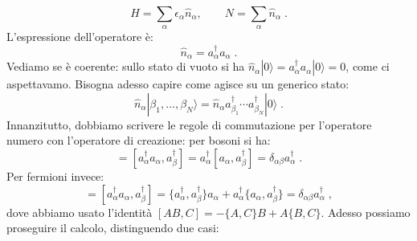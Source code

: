 \documentclass[10pt,a4paper]{report}
\theoremstyle{definition}
\numberwithin{equation}{section}
\newcommand{\ket}{\rangle}
\begin{document}
$$
H=\sum_{\alpha}\epsilon_{\alpha}\hat{n}_{\alpha},\qquad N=\sum_{\alpha}\hat{n}_{\alpha}\;.
$$
L'espressione dell'operatore è:
\begin{equation}
\hat{n}_{\alpha}=a_{\alpha}^{\dagger}a_{\alpha}\;.
\end{equation}
Vediamo se è coerente: sullo stato di vuoto si ha $\hat{n}_{\alpha}|0\ket=a_{\alpha}^{\dagger}a_{\alpha}|0\ket=0$, come ci aspettavamo. Bisogna adesso capire come agisce su un generico stato:
$$
\hat{n}_{\alpha}|\beta_1,\ldots,\beta_N\ket=\hat{n}_{\alpha}a_{\beta_1}^{\dagger}\cdots a_{\beta_N}^{\dagger}|0\ket\;.
$$
Innanzitutto, dobbiamo scrivere le regole di commutazione per l'operatore numero con l'operatore di creazione: per bosoni si ha:
\begin{equation}
[\hat{n}_{\alpha},a_{\beta}^{\dagger}]=[a_{\alpha}^{\dagger}a_{\alpha},a_{\beta}^{\dagger}]=a_{\alpha}^{\dagger}[a_{\alpha},a_{\beta}^{\dagger}]=\delta_{\alpha\beta}a_{\alpha}^{\dagger}\;.
\end{equation}
Per fermioni invece:
\begin{equation}
[\hat{n}_{\alpha},a_{\beta}^{\dagger}]=[a_{\alpha}^{\dagger}a_{\alpha},a_{\beta}^{\dagger}]=\{a_{\alpha}^{\dagger},a_{\beta}^
{\dagger}\}a_{\alpha}+a_{\alpha}^{\dagger}\{a_{\alpha},a_{\beta}^{\dagger}\}=\delta_{\alpha\beta}a_{\alpha}^{\dagger}\;,
\end{equation}
dove abbiamo usato l'identità $[AB,C]=-\{A,C\}B+A\{B,C\}$. Adesso possiamo proseguire il calcolo, distinguendo due casi:
\end{document}
